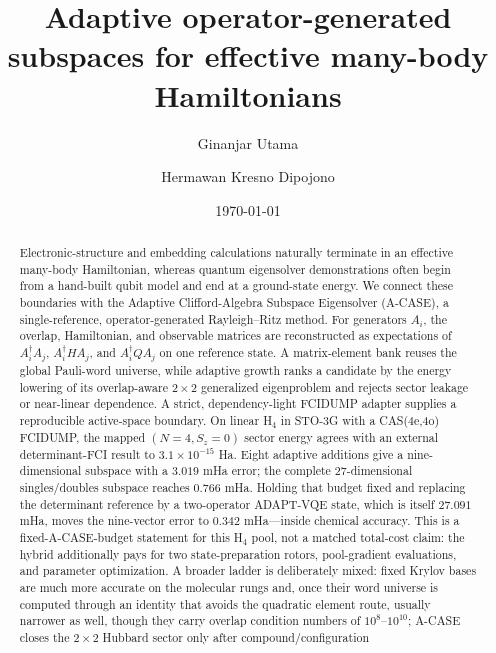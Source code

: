 \documentclass[aps,pra,reprint,superscriptaddress,nofootinbib,floatfix]{revtex4-2}
\begin{document}
\title{Adaptive operator-generated subspaces for effective many-body Hamiltonians}

\author{Ginanjar Utama}

\author{Hermawan Kresno Dipojono}

\date{\today}

\begin{abstract}
Electronic-structure and embedding calculations naturally terminate in an
effective many-body Hamiltonian, whereas quantum eigensolver demonstrations
often begin from a hand-built qubit model and end at a ground-state energy.
We connect these boundaries with the Adaptive Clifford-Algebra Subspace
Eigensolver (A-CASE), a single-reference, operator-generated Rayleigh--Ritz
method.  For generators $A_i$, the overlap, Hamiltonian, and observable
matrices are reconstructed as expectations of
$A_i^\dagger A_j$, $A_i^\dagger H A_j$, and
$A_i^\dagger Q A_j$ on one reference state.  A matrix-element bank reuses the
global Pauli-word universe, while adaptive growth ranks a candidate by the
energy lowering of its overlap-aware $2\times2$ generalized eigenproblem and
rejects sector leakage or near-linear dependence.  A strict, dependency-light
FCIDUMP adapter supplies a reproducible active-space boundary.  On linear
H$_4$ in STO-3G with a CAS(4e,4o) FCIDUMP, the mapped $(N=4,S_z=0)$ sector
energy agrees with an external determinant-FCI result to
$3.1\times10^{-15}$ Ha.  Eight adaptive additions give a nine-dimensional
subspace with a $3.019$ mHa error; the complete 27-dimensional
singles/doubles subspace reaches $0.766$ mHa.  Holding that budget fixed and
replacing the determinant reference by a two-operator ADAPT-VQE state, which
is itself $27.091$ mHa, moves the nine-vector error to $0.342$ mHa---inside
chemical accuracy.  This is a fixed-A-CASE-budget statement for this H$_4$
pool, not a matched total-cost claim: the hybrid additionally pays for two
state-preparation rotors, pool-gradient evaluations, and parameter
optimization.  A broader ladder is deliberately mixed: fixed Krylov bases are much
more accurate on the molecular rungs and, once their word universe is computed
through an identity that avoids the quadratic element route, usually narrower
as well, though they carry overlap condition numbers of $10^8$--$10^{10}$;
A-CASE closes the $2\times2$ Hubbard sector only after compound/configuration

\end{abstract}
\end{document}
